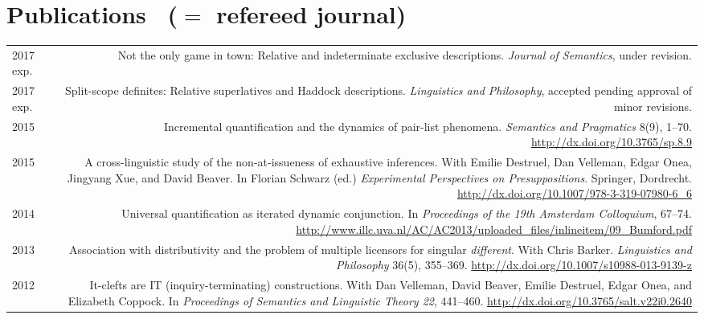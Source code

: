 \documentclass[12pt]{article}
\newcommand{\doi}[1]{\url{http://dx.doi.org/#1}}
\begin{document}
\medskip

\section*{Publications \ \textrm{(\textdagger ${}={}$ refereed journal)}} 

\begin{longtable}{LR}
  2017 exp. & Not the only game in town: Relative and indeterminate exclusive
              descriptions. \textit{Journal of Semantics}, under revision.\\
  2017 exp. & Split-scope definites: Relative superlatives and Haddock
              descriptions. \textit{Linguistics and Philosophy}, accepted
              pending approval of minor revisions.\\
  2015  & Incremental quantification and the dynamics of pair-list phenomena.
          \textit{Semantics and Pragmatics} 8(9), 1--70.
          \doi{10.3765/sp.8.9}\\
  2015  & A cross-linguistic study of the non-at-issueness of exhaustive
          inferences. With Emilie Destruel, Dan Velleman, Edgar Onea, Jingyang
          Xue, and David Beaver.  In Florian Schwarz (ed.)
          \textit{Experimental Perspectives on Presuppositions}. Springer,
          Dordrecht. \doi{10.1007/978-3-319-07980-6_6}\\ %
  2014  & Universal quantification as iterated dynamic conjunction. In
          \textit{Proceedings of the 19th Amsterdam Colloquium}, 67--74.
          \url{http://www.illc.uva.nl/AC/AC2013/uploaded_files/inlineitem/09_Bumford.pdf}\\
  2013  & Association with distributivity and the problem of multiple
          licensors for singular \textit{different}. With Chris Barker.
          \textit{Linguistics and Philosophy} 36(5), 355--369.
          \doi{10.1007/s10988-013-9139-z}\\ %
  2012  & It-clefts are IT (inquiry-terminating) constructions. With Dan
          Velleman, David Beaver, Emilie Destruel, Edgar Onea, and Elizabeth
          Coppock. In \textit{Proceedings of Semantics and Linguistic Theory
          22}, 441--460. \doi{10.3765/salt.v22i0.2640}
\end{longtable}
\end{document}
